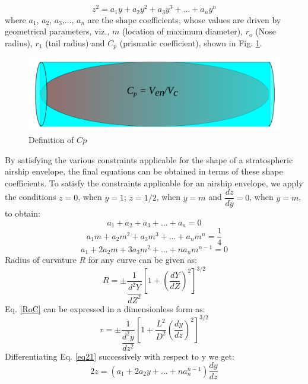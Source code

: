 \begin{equation}
\label{eq21}
z^2 = a_1y + a_2y^2 + a_3y^3 + ... + a_ny^n	
\end{equation}
where $a_1$, $a_2$, $a_3$,..., $a_n$ are the shape coefficients, whose values are driven by  geometrical parameters, viz., $m$ (location of maximum diameter), $r_o$ (Nose radius), $r_1$ (tail radius) and $C_p$ (prismatic coefficient), shown in Fig. \ref{fig:cp}. 
\begin{figure}[H]
	\centering
	\includegraphics[width=0.7\linewidth]{rnd/c_p_definition.png}
	\caption{Definition of $ Cp $}
	\label{fig:cp}
\end{figure}
By satisfying the various constraints applicable for the shape of a stratospheric airship envelope, the final equations can be obtained in terms of these shape coefficients. To satisfy the constraints applicable for an airship envelope, we apply the conditions $z = 0$, when $y = 1$; $z = 1/2$, when $y = m$ and $\dfrac{dz}{dy} = 0$, when $y = m$, to obtain:
\begin{equation}
a_1 + a_2 + a_3 + ... + a_n = 0	
\end{equation}
\begin{equation}
a_1m + a_2m^2 + a_3m^3 + ... + a_nm^n = \frac{1}{4}	
\end{equation}
\begin{equation}
a_1 + 2a_2m + 3a_3m^2 + ... + na_nm^{n-1} =0	
\end{equation}
Radius of curvature $R$ for any curve can be given as:
\begin{equation}
R = \pm \dfrac{1}{\dfrac{d^2Y}{dZ^2}}\left[1+\left(\dfrac{dY}{dZ}\right)^2\right]^{3/2}
\label{RoC}	
\end{equation}
Eq. \ref {RoC} can be expressed in a  dimensionless form as:
\begin{equation}
\label{eq24}
r = \pm \dfrac{1}{\dfrac{d^2y}{dz^2}}\left[1+\frac{L^2}{D^2}\left(\dfrac{dy}{dz}\right)^2\right]^{3/2}	
\end{equation}
Differentiating Eq. \ref{eq21} successively with respect to y we get:
\begin{equation}
\label{eq22}
2z = \left(a_1 + 2a_2y +...+ na_n^{n-1}\right)\dfrac{dy}{dz}
\end{equation}
